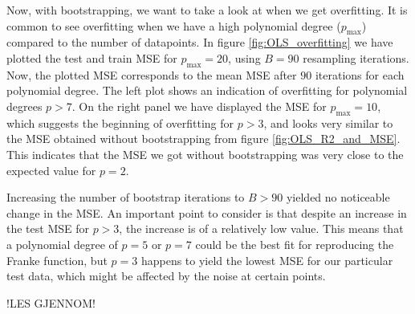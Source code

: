 \documentclass[reprint,english,notitlepage,aps,nobalancelastpage,nofootinbib]{revtex4-1}  %
\begin{document}
Now, with bootstrapping, we want to take a look at when we get overfitting. It is common to see overfitting when we have a high polynomial degree ($p_\text{max}$) compared to the number of datapoints. In figure \ref{fig:OLS_overfitting} we have plotted the test and train MSE for $p_\text{max} = 20$, using $B=90$ resampling iterations. Now, the plotted MSE corresponds to the mean MSE after $90$ iterations for each polynomial degree. The left plot shows an indication of overfitting for polynomial degrees $p > 7$. On the right panel we have displayed the MSE for $p_\text{max} = 10$, which suggests the beginning of overfitting for $p>3$, and looks very similar to the MSE obtained without bootstrapping from figure \ref{fig:OLS_R2_and_MSE}. This indicates that the MSE we got without bootstrapping was very close to the expected value for $p=2$.

Increasing the number of bootstrap iterations to $B>90$ yielded no noticeable change in the MSE.  An important point to consider is that despite an increase in the test MSE for $p>3$, the increase is of a relatively low value. This means that a polynomial degree of $p=5$ or $p=7$ could be the best fit for reproducing the Franke function, but $p=3$ happens to yield the lowest MSE for our particular test data, which might be affected by the noise at certain points.

!LES GJENNOM!
\end{document}
